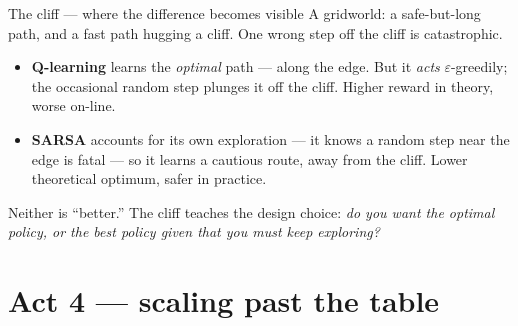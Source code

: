 \documentclass[10pt, aspectratio=169]{beamer}
\begin{document}
\begin{frame}{The cliff --- where the difference becomes visible}
A gridworld: a safe-but-long path, and a fast path hugging a cliff. One wrong step off the cliff is catastrophic.
\medskip
\begin{center}
\end{center}
\medskip

\pause
\begin{itemize}\setlength\itemsep{1pt}
\item \textbf{Q-learning} learns the \emph{optimal} path --- along the edge. But it \emph{acts} $\varepsilon$-greedily; the occasional random step plunges it off the cliff. Higher reward in theory, worse on-line.
\item \textbf{SARSA} accounts for its own exploration --- it knows a random step near the edge is fatal --- so it learns a \alert{cautious} route, away from the cliff. Lower theoretical optimum, safer in practice.
\end{itemize}
\medskip
\pause
{\footnotesize\textcolor{mLightBrown}{Neither is ``better.'' The cliff teaches the design choice: \emph{do you want the optimal policy, or the best policy given that you must keep exploring?}}}
\end{frame}

\section{Act 4 --- scaling past the table}
\end{document}
